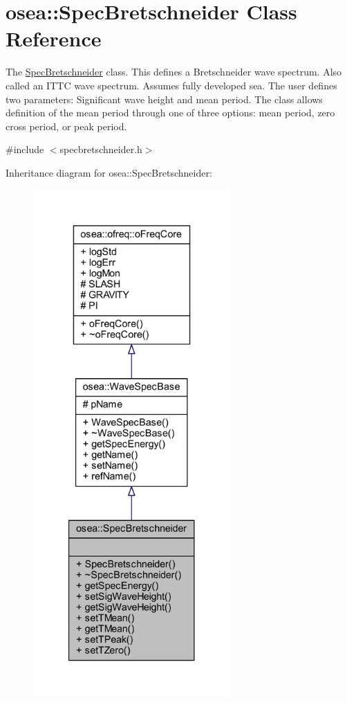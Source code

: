 \hypertarget{classosea_1_1_spec_bretschneider}{\section{osea\-:\-:Spec\-Bretschneider Class Reference}
\label{classosea_1_1_spec_bretschneider}
}


The \hyperlink{classosea_1_1_spec_bretschneider}{Spec\-Bretschneider} class. This defines a Bretschneider wave spectrum. Also called an I\-T\-T\-C wave spectrum. Assumes fully developed sea. The user defines two parameters\-: Significant wave height and mean period. The class allows definition of the mean period through one of three options\-: mean period, zero cross period, or peak period.  




{\ttfamily \#include $<$specbretschneider.\-h$>$}



Inheritance diagram for osea\-:\-:Spec\-Bretschneider\-:
\nopagebreak
\begin{figure}[H]
\begin{center}
\leavevmode
\includegraphics[height=550pt]{classosea_1_1_spec_bretschneider__inherit__graph}
\end{center}
\end{figure}
